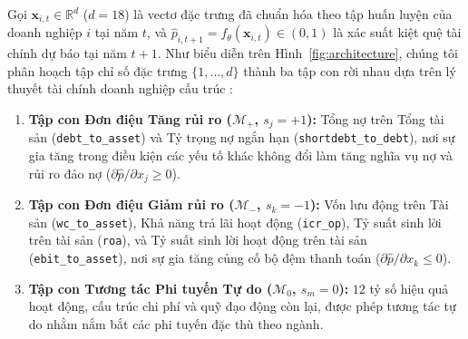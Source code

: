 \documentclass[11pt,a4paper]{article}
\begin{document}
Gọi $\mathbf{x}_{i,t} \in \mathbb{R}^d$ ($d=18$) là vectơ đặc trưng đã chuẩn hóa theo tập huấn luyện của doanh nghiệp $i$ tại năm $t$, và $\hat{p}_{i,t+1} = f_\theta(\mathbf{x}_{i,t}) \in (0,1)$ là xác suất kiệt quệ tài chính dự báo tại năm $t+1$. Như biểu diễn trên Hình~\ref{fig:architecture}, chúng tôi phân hoạch tập chỉ số đặc trưng $\{1,\dots,d\}$ thành ba tập con rời nhau dựa trên lý thuyết tài chính doanh nghiệp cấu trúc \citep{merton1974pricing,altman1968financial}:
\begin{enumerate}
    \item \textbf{Tập con Đơn điệu Tăng rủi ro ($\mathcal{M}_+$, $s_j = +1$):} Tổng nợ trên Tổng tài sản (\texttt{debt\_to\_asset}) và Tỷ trọng nợ ngắn hạn (\texttt{shortdebt\_to\_debt}), nơi sự gia tăng trong điều kiện các yếu tố khác không đổi làm tăng nghĩa vụ nợ và rủi ro đảo nợ ($\partial \hat{p} / \partial x_j \ge 0$).
    \item \textbf{Tập con Đơn điệu Giảm rủi ro ($\mathcal{M}_-$, $s_k = -1$):} Vốn lưu động trên Tài sản (\texttt{wc\_to\_asset}), Khả năng trả lãi hoạt động (\texttt{icr\_op}), Tỷ suất sinh lời trên tài sản (\texttt{roa}), và Tỷ suất sinh lời hoạt động trên tài sản (\texttt{ebit\_to\_asset}), nơi sự gia tăng củng cố bộ đệm thanh toán ($\partial \hat{p} / \partial x_k \le 0$).
    \item \textbf{Tập con Tương tác Phi tuyến Tự do ($\mathcal{M}_0$, $s_m = 0$):} $12$ tỷ số hiệu quả hoạt động, cấu trúc chi phí và quỹ đạo động còn lại, được phép tương tác tự do nhằm nắm bắt các phi tuyến đặc thù theo ngành.
\end{enumerate}
\end{document}
